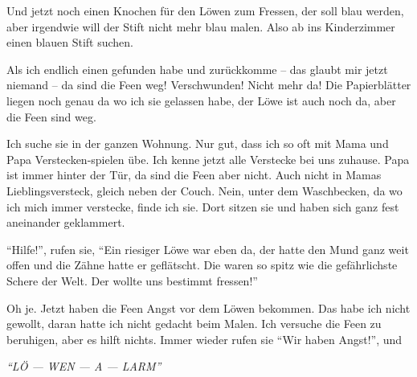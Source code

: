Und jetzt noch einen Knochen für den Löwen zum Fressen, der soll blau werden, aber irgendwie will der Stift nicht mehr blau malen. Also ab ins Kinderzimmer einen blauen Stift suchen.

Als ich endlich einen gefunden habe und zurückkomme -- das glaubt mir jetzt niemand -- da sind die Feen weg! Verschwunden! Nicht mehr da! Die Papierblätter liegen noch genau da wo ich sie gelassen habe, der Löwe ist auch noch da, aber die Feen sind weg.

Ich suche sie in der ganzen Wohnung. Nur gut, dass ich so oft mit Mama und Papa Verstecken-spielen übe. Ich kenne jetzt alle Verstecke bei uns zuhause. Papa ist immer hinter der Tür, da sind die Feen aber nicht. Auch nicht in Mamas Lieblingsversteck, gleich neben der Couch. Nein, unter dem Waschbecken, da wo ich mich immer verstecke, finde ich sie. Dort sitzen sie und haben sich ganz fest aneinander geklammert.

\enquote{Hilfe!}, rufen sie, \enquote{Ein riesiger Löwe war eben da, der hatte den Mund ganz weit offen und die Zähne hatte er geflätscht. Die waren so spitz wie die gefährlichste Schere der Welt. Der wollte uns bestimmt fressen!}




Oh je. Jetzt haben die Feen Angst vor dem Löwen bekommen. Das habe ich nicht gewollt, daran hatte ich nicht gedacht beim Malen.  Ich versuche die Feen zu beruhigen, aber es hilft nichts. Immer wieder rufen sie \enquote{Wir haben Angst!}, und
\begin{center}
 {\color{red}
\large
\itshape
\enquote{LÖ --- WEN --- A --- LARM}}
\end{center}

